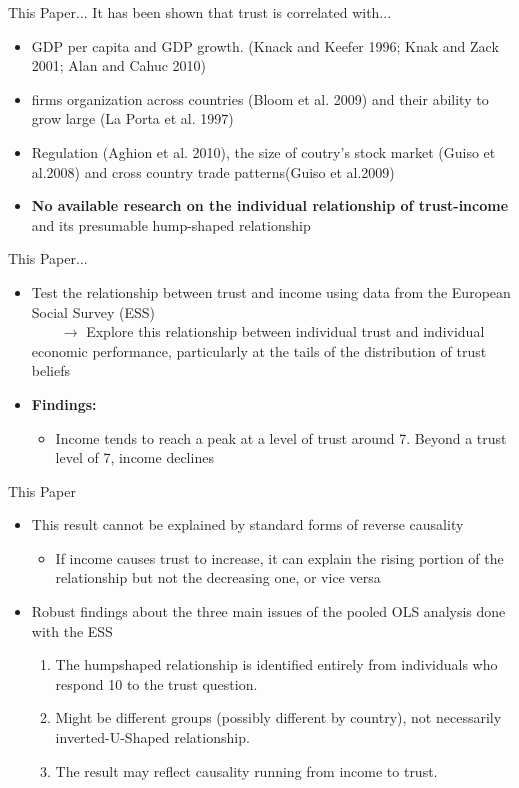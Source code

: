 \documentclass[pdftex,12pt,xcolor=pdftex,table]{beamer}
\begin{document}
\begin{frame}{This Paper...}
It has been shown that trust is correlated with...
    \begin{itemize}
        \item  GDP per capita and GDP growth. (Knack and Keefer 1996; Knak and Zack 2001; Alan and Cahuc 2010)
        \item firms organization across countries (Bloom et al. 2009) and their ability to grow large (La Porta et al. 1997)
        \item Regulation (Aghion et al. 2010), the size of coutry's stock market (Guiso et al.2008) and cross country trade patterns(Guiso et al.2009) \pause
        \item \textbf{No available research on the individual relationship of trust-income} and its presumable hump-shaped relationship
    \end{itemize}
\end{frame}
\begin{frame}{This Paper...}
    \begin{itemize}
        \item Test the relationship between trust and income using data from the European Social Survey (ESS) \\
            $\qquad \to$ Explore this relationship between individual trust and individual economic performance, particularly at the tails of the distribution of trust beliefs 
        \item \textbf{Findings:}
            \begin{itemize}
                \item Income tends to reach a peak at a level of trust around 7. Beyond a trust level of 7, income declines
            \end{itemize}
    \end{itemize}
\end{frame}
\begin{frame}{This Paper}
    \begin{itemize}
        \item This result cannot be explained by standard forms of reverse causality
        \begin{itemize}
            \item If income causes trust to increase, it can explain the rising portion of the relationship but not the decreasing one, or vice versa
        \end{itemize} \pause
        \item Robust findings about the three main issues of the pooled OLS analysis done with the ESS
         \begin{enumerate}
        \item The humpshaped relationship is identified entirely from individuals who respond 10 to the trust question.
        \item Might be different groups (possibly different by country), not necessarily inverted-U-Shaped relationship.
       \item The result may reflect causality running from income to trust.
    \end{enumerate}
    \end{itemize}
\end{frame}
\end{document}

